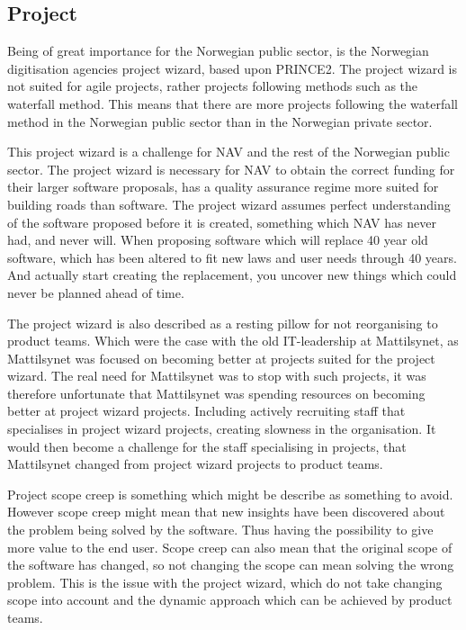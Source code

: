 
\subsection{Project}
Being of great importance for the Norwegian public sector, is the Norwegian digitisation agencies project wizard, based upon PRINCE2. The project wizard is not suited for agile projects, rather projects following methods such as the waterfall method. This means that there are more projects following the waterfall method in the Norwegian public sector than in the Norwegian private sector. 

This project wizard is a challenge for NAV and the rest of the Norwegian public sector. The project wizard is necessary for NAV to obtain the correct funding for their larger software proposals, has a quality assurance regime more suited for building roads than software. The project wizard assumes perfect understanding of the software proposed before it is created, something which NAV has never had, and never will. When proposing software which will replace 40 year old software, which has been altered to fit new laws and user needs through 40 years. And actually start creating the replacement, you uncover new things which could never be planned ahead of time.

The project wizard is also described as a resting pillow for not reorganising to product teams. Which were the case with the old IT-leadership at Mattilsynet, as Mattilsynet was focused on becoming better at projects suited for the project wizard. The real need for Mattilsynet was to stop with such projects, it was therefore unfortunate that Mattilsynet was spending resources on becoming better at project wizard projects. Including actively recruiting staff that specialises in project wizard projects, creating slowness in the organisation. It would then become a challenge for the staff specialising in projects, that Mattilsynet changed from project wizard projects to product teams.

Project scope creep is something which might be describe as something to avoid. However scope creep might mean that new insights have been discovered about the problem being solved by the software. Thus having the possibility to give more value to the end user. Scope creep can also mean that the original scope of the software has changed, so not changing the scope can mean solving the wrong problem. This is the issue with the project wizard, which do not take changing scope into account and the dynamic approach which can be achieved by product teams.

